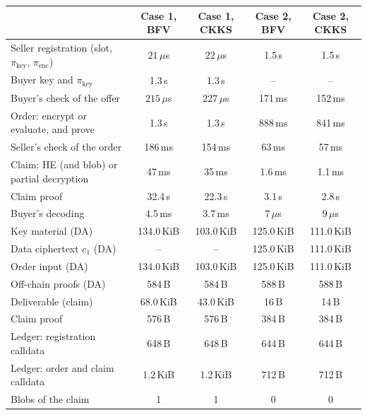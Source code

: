 \begin{tabular}{lcccc}
\toprule
 & Case 1, BFV & Case 1, CKKS & Case 2, BFV & Case 2, CKKS \\
\midrule
Seller registration (slot, $\pi_{\text{key}}$, $\pi_{\text{enc}}$) & $21\,\mu$s & $22\,\mu$s & 1.5\,s & 1.5\,s \\
Buyer key and $\pi_{\text{key}}$ & 1.3\,s & 1.3\,s & -- & -- \\
Buyer's check of the offer & $215\,\mu$s & $227\,\mu$s & 171\,ms & 152\,ms \\
Order: encrypt or evaluate, and prove & 1.3\,s & 1.3\,s & 888\,ms & 841\,ms \\
Seller's check of the order & 186\,ms & 154\,ms & 63\,ms & 57\,ms \\
Claim: HE (and blob) or partial decryption & 47\,ms & 35\,ms & 1.6\,ms & 1.1\,ms \\
Claim proof & 32.4\,s & 22.3\,s & 3.1\,s & 2.8\,s \\
Buyer's decoding & 4.5\,ms & 3.7\,ms & $7\,\mu$s & $9\,\mu$s \\
\midrule
Key material (DA) & 134.0\,KiB & 103.0\,KiB & 125.0\,KiB & 111.0\,KiB \\
Data ciphertext $c_1$ (DA) & -- & -- & 125.0\,KiB & 111.0\,KiB \\
Order input (DA) & 134.0\,KiB & 103.0\,KiB & 125.0\,KiB & 111.0\,KiB \\
Off-chain proofs (DA) & 584\,B & 584\,B & 588\,B & 588\,B \\
Deliverable (claim) & 68.0\,KiB & 43.0\,KiB & 16\,B & 14\,B \\
Claim proof & 576\,B & 576\,B & 384\,B & 384\,B \\
Ledger: registration calldata & 648\,B & 648\,B & 644\,B & 644\,B \\
Ledger: order and claim calldata & 1.2\,KiB & 1.2\,KiB & 712\,B & 712\,B \\
Blobs of the claim & 1 & 1 & 0 & 0 \\
\bottomrule
\end{tabular}

